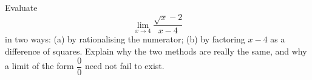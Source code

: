 Evaluate
\[
\lim_{x\to4}\dfrac{\sqrt x-2}{x-4}
\]
in two ways: (a) by rationalising the numerator; (b) by factoring $x-4$ as a difference of squares. Explain why the two methods are really the same, and why a limit of the form $\dfrac{0}{0}$ need not fail to exist.
